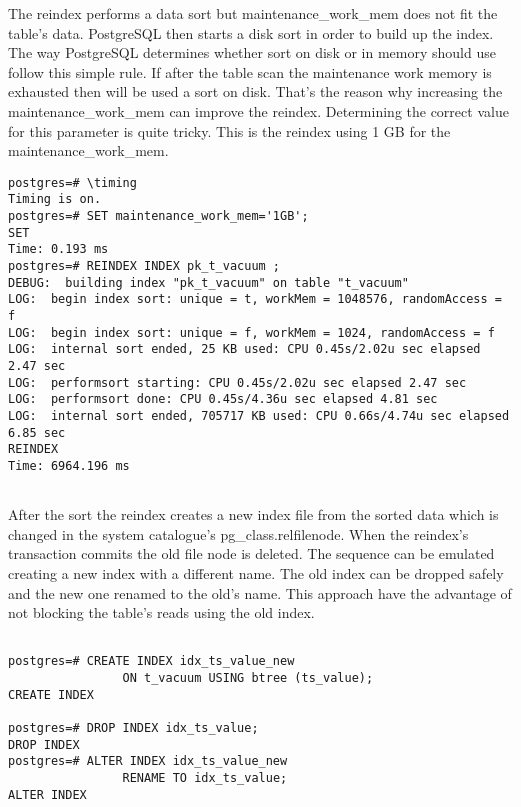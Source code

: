 The reindex performs a data sort but maintenance\_work\_mem does not fit the table's data. PostgreSQL
then starts a disk sort in order to build up the index. The way PostgreSQL determines whether sort
on disk or in memory should use follow this simple rule. If after the table scan the maintenance work
memory is exhausted then will be used a sort on disk. That's the reason why increasing the
maintenance\_work\_mem  can improve the reindex. Determining the correct value for this parameter is
quite tricky.\newline
This is the reindex using 1 GB for the maintenance\_work\_mem.

\begin{lstlisting}[style=pgsql]
postgres=# \timing
Timing is on.
postgres=# SET maintenance_work_mem='1GB';
SET
Time: 0.193 ms
postgres=# REINDEX INDEX pk_t_vacuum ;
DEBUG:  building index "pk_t_vacuum" on table "t_vacuum"
LOG:  begin index sort: unique = t, workMem = 1048576, randomAccess = f
LOG:  begin index sort: unique = f, workMem = 1024, randomAccess = f
LOG:  internal sort ended, 25 KB used: CPU 0.45s/2.02u sec elapsed 2.47 sec
LOG:  performsort starting: CPU 0.45s/2.02u sec elapsed 2.47 sec
LOG:  performsort done: CPU 0.45s/4.36u sec elapsed 4.81 sec
LOG:  internal sort ended, 705717 KB used: CPU 0.66s/4.74u sec elapsed 6.85 sec
REINDEX
Time: 6964.196 ms


\end{lstlisting}

After the sort the reindex creates a new index file from the sorted data which is changed in the system
catalogue's pg\_class.relfilenode. When the reindex's transaction commits the old file node is deleted. The
sequence can be emulated creating a new index with a different name. The old index can be dropped safely
and the new one renamed to the old's name. This approach have the advantage of not blocking the
table's reads using the old index.\newline

\begin{lstlisting}[style=pgsql]

postgres=# CREATE INDEX idx_ts_value_new
                ON t_vacuum USING btree (ts_value);
CREATE INDEX

postgres=# DROP INDEX idx_ts_value;
DROP INDEX
postgres=# ALTER INDEX idx_ts_value_new
                RENAME TO idx_ts_value;
ALTER INDEX

\end{lstlisting}



